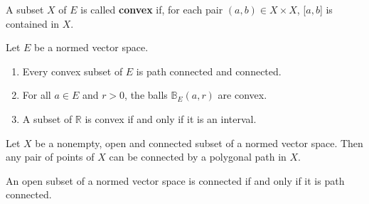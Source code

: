 A subset \(X\) of \(E\) is called \textbf{convex} if, for each pair 
\(\left(a, b\right) \in X \times X\), [\(a, b\)] is contained in \(X\). 

\begin{remark}
    Let \(E\) be a normed vector space. 
    \begin{enumerate}[label=(\alph*)]
        \item Every convex subset of \(E\) is path connected and connected. 
        \item For all \(a \in E\) and \(r > 0\), the balls \(\mathbb{B}_E\left(a, r\right)\) are convex. 
        \item A subset of \(\mathbb{R}\) is convex if and only if it is an interval. 
    \end{enumerate}
\end{remark}


\begin{theorem}
    Let \(X\) be a nonempty, open and connected subset of a normed vector space. 
    Then any pair of points of \(X\) can be connected by a polygonal path in \(X\). 
\end{theorem}

\begin{corollary}
    An open subset of a normed vector space is connected if and only if it is path connected. 
\end{corollary}








